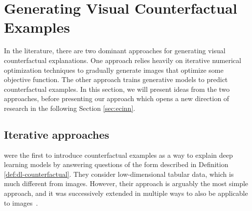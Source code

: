 \documentclass[11pt,a4paper,twoside,openright,final]{memoir}
\begin{document}


\section{Generating Visual Counterfactual Examples}
In the literature, there are two dominant approaches for generating visual counterfactual explanations.
One approach relies heavily on iterative numerical optimization techniques to gradually generate images that optimize some objective function.
The other approach trains generative models to predict counterfactual examples. 
In this section, we will present ideas from the two approaches, before presenting our approach which opens a new direction of research in the following Section \ref{sec:ecinn}. 
\subsection{Iterative approaches}
\citet{Wachter2017} were the first to introduce counterfactual examples as a way to explain deep learning models by answering questions of the form described in Definition \ref{def:dl-counterfactual}. 
They consider low-dimensional tabular data, which is much different from images.
However, their approach is arguably the most simple approach, and it was successively extended in multiple ways to also be applicable to images~\cite{Dhurandhar2018, VanLooveren2019}. 
\end{document}
